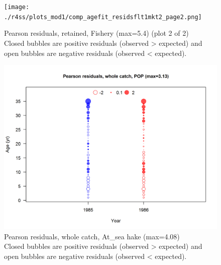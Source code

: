 \documentclass[12pt,]{article}
\begin{document}
\begin{figure}
\centering
\texttt{[image: ./r4ss/plots\_mod1/comp\_agefit\_residsflt1mkt2\_page2.png]}
\caption{Pearson residuals, retained, Fishery (max=5.4) (plot 2 of 2)\\
Closed bubbles are positive residuals (observed \textgreater{} expected)
and open bubbles are negative residuals (observed \textless{} expected).
\label{fig:fishery_age_pearson}}
\end{figure}

\begin{figure}
\centering
\includegraphics{./r4ss/plots_mod1/comp_agefit_residsflt2mkt0.png}
\caption{Pearson residuals, whole catch, At\_sea hake (max=4.08)\\
Closed bubbles are positive residuals (observed \textgreater{} expected)
and open bubbles are negative residuals (observed \textless{} expected).
\label{fig:ashop_age_pearson}}
\end{figure}
\end{document}
